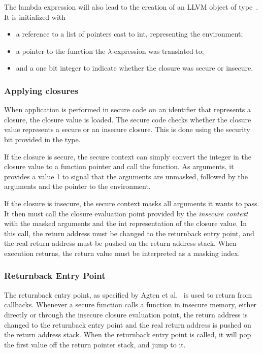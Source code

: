 The lambda expression will also lead to the creation of an LLVM object of type\ .
It is initialized with
\begin{itemize}
\item a reference to a list of pointers cast to int, representing the environment;
\item a pointer to the function the $\lambda$-expression was translated to;
\item and a one bit integer to indicate whether the closure was secure or insecure.
\end{itemize}

\subsubsection{Applying closures}
When application is performed in secure code on an identifier that represents a closure, the closure value is loaded.
The secure code checks whether the closure value represents a secure or an insecure closure.
This is done using the security bit provided in the  type.

If the closure is secure, the secure context can simply convert the integer in the closure value to a function pointer and call the function.
As arguments, it provides a value 1 to signal that the arguments are unmasked, followed by the arguments and the pointer to the environment.

If the closure is insecure, the secure context masks all arguments it wants to pass. It then must call the closure evaluation point provided by the \emph{insecure context} with the masked arguments and the int representation of the closure value.
In this call, the return address must be changed to the returnback entry point, and the real return address must be pushed on the return address stack.
When execution returns, the return value must be interpreted as a masking index.

\subsubsection{Returnback Entry Point}
The returnback entry point, as specified by Agten et al.~\cite{Agten:2012:SCM:2354412.2355247} is used to return from callbacks.
Whenever a secure function calls a function in insecure memory, either directly or through the insecure closure evaluation point, the return address is changed to the returnback entry point and the real return address is pushed on the return address stack. When the returnback entry point is called, it will pop the first value off the return pointer stack, and jump to it.

